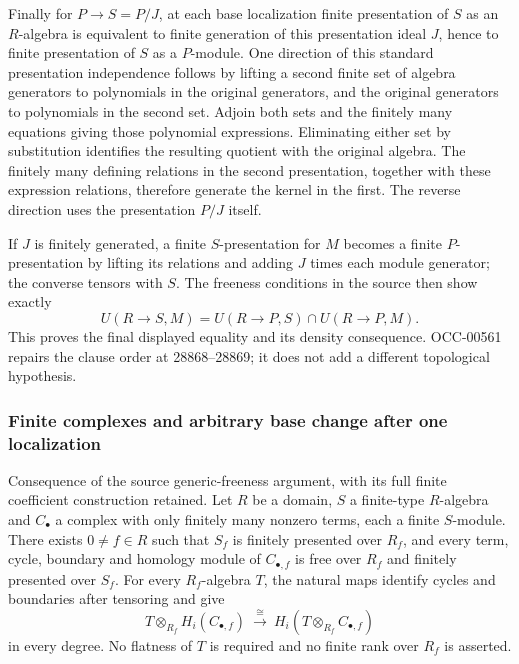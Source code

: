 Finally for \(P\to S=P/J\), at each base localization finite presentation of \(S\) as an \(R\)-algebra is equivalent to finite generation of this presentation ideal \(J\), hence to finite presentation of \(S\) as a \(P\)-module. One direction of this standard presentation independence follows by lifting a second finite set of algebra generators to polynomials in the original generators, and the original generators to polynomials in the second set. Adjoin both sets and the finitely many equations giving those polynomial expressions. Eliminating either set by substitution identifies the resulting quotient with the original algebra. The finitely many defining relations in the second presentation, together with these expression relations, therefore generate the kernel in the first. The reverse direction uses the presentation \(P/J\) itself.

If \(J\) is finitely generated, a finite \(S\)-presentation for \(M\) becomes a finite \(P\)-presentation by lifting its relations and adding \(J\) times each module generator; the converse tensors with \(S\). The freeness conditions in the source then show exactly \[
 U(R\to S,M)=U(R\to P,S)\cap U(R\to P,M).
\] This proves the final displayed equality and its density consequence. OCC-00561 repairs the clause order at 28868--28869; it does not add a different topological hypothesis.

\subsubsection{Finite complexes and arbitrary base change after one localization}\label{algebra-proof-027-finite-complexes-and-arbitrary-base-change-after-one-localization}

Consequence of the source generic-freeness argument, with its full finite coefficient construction retained. Let \(R\) be a domain, \(S\) a finite-type \(R\)-algebra and \(C_\bullet\) a complex with only finitely many nonzero terms, each a finite \(S\)-module. There exists \(0\ne f\in R\) such that \(S_f\) is finitely presented over \(R_f\), and every term, cycle, boundary and homology module of \(C_{\bullet,f}\) is free over \(R_f\) and finitely presented over \(S_f\). For every \(R_f\)-algebra \(T\), the natural maps identify cycles and boundaries after tensoring and give \[
 T\otimes_{R_f}H_i(C_{\bullet,f})
 \ \xrightarrow{\ \cong\ }\
 H_i(T\otimes_{R_f}C_{\bullet,f})
\] in every degree. No flatness of \(T\) is required and no finite rank over \(R_f\) is asserted.

